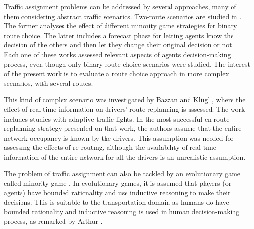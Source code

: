\documentclass{RITA}
\begin{document}


Traffic assignment problems can be addressed by several approaches, many of them considering abstract traffic scenarios. Two-route scenarios are studied in \cite{Bazzan+2000icmas,Kluegl&Bazzan2004}. The former analyses the effect of different minority game strategies for binary route choice. The latter includes a forecast phase for letting agents know the decision of the others and then let they change their original decision or not. Each one of these works assessed relevant aspects of agents decision-making process, even though only binary route choice scenarios were studied. The interest of the present work is to evaluate a route choice approach in more complex scenarios, with several routes.

This kind of complex scenario was investigated by Bazzan and Kl\"ugl \cite{Bazzan&Kluegl2008}, where the effect of real time information on drivers' route replanning is assessed. The work includes studies with adaptive traffic lights. In the most successful en-route replanning strategy presented on that work, the authors assume that the entire network occupancy is known by the drivers. This assumption was needed for assessing the effects of re-routing, although the availability of real time information of the entire network for all the drivers is an unrealistic assumption.

The problem of traffic assignment can also be tackled by an evolutionary game called minority game \cite{Challet&Zhang1997}. In evolutionary games, it is assumed that players (or agents) have bounded rationality and use inductive reasoning to make their decisions. This is suitable to the transportation domain as humans do have bounded rationality and inductive reasoning is used in human decision-making process, as remarked by Arthur \cite{Arthur1994}.
\end{document}
